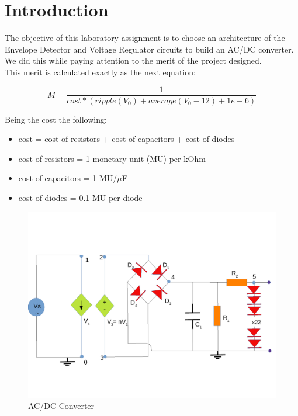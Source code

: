 \newpage
\section{Introduction}
\label{sec:introduction}

The objective of this laboratory assignment is to choose an architecture of the Envelope Detector and Voltage Regulator circuits to build an AC/DC converter. We did this while paying attention to the merit of the project designed.\\
This merit is calculated exactly as the next equation:

\begin{equation} 
M = \frac{1}{cost*(ripple(V_{0}) + average(V_{0}-12) + 1e-6)}
\label{eq1}
\end{equation}

Being the cost the following:
\begin{itemize}
	\item cost = cost of resistors  + cost of capacitors + cost of diodes
	\item cost of resistors = 1 monetary unit (MU) per kOhm
	\item cost of capacitors = 1 MU/$\mu$F
	\item cost of diodes = 0.1 MU per diode
	
\end{itemize}

\begin{figure}[H] 
\centering
\includegraphics[width=\textwidth]{lab3draw.pdf} 
\caption{AC/DC Converter}
\label{fig:first}

\end{figure}

